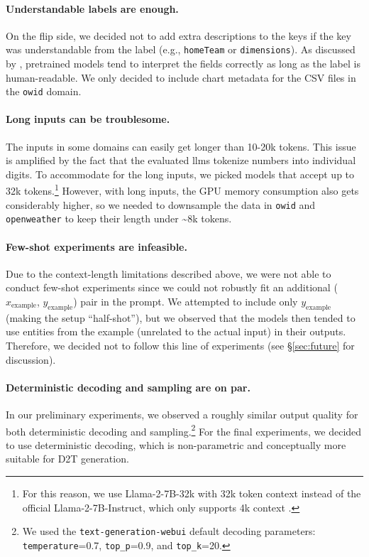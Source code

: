 \paragraph{Understandable labels are enough.} On the flip side, we decided not to add extra descriptions to the keys if the key was understandable from the label (e.g., \texttt{homeTeam} or \texttt{dimensions}). As discussed by \citet{kasner2023mind}, pretrained models tend to interpret the fields correctly as long as the label is human-readable. We only decided to include chart metadata for the CSV files in the \texttt{owid} domain.

\paragraph{Long inputs can be troublesome.} The inputs in some domains can easily get longer than 10-20k tokens. This issue is amplified by the fact that the evaluated \acp{llm} tokenize numbers into individual digits. To accommodate for the long inputs, we picked models that accept up to 32k tokens.\footnote{For this reason, we use Llama-2-7B-32k with 32k token context \cite{llama-2-7b-32k} instead of the official Llama-2-7B-Instruct, which only supports 4k context \cite{touvronLlamaOpenFoundation2023}.} However, with long inputs, the GPU memory consumption also gets considerably higher, so we needed to downsample the data in \texttt{owid} and \texttt{openweather} to keep their length under \textasciitilde 8k tokens.


\paragraph{Few-shot experiments are infeasible.} Due to the context-length limitations described above, we were not able to conduct few-shot experiments since we could not robustly fit an additional ($x_\text{example}$, $y_\text{example}$) pair in the prompt. We attempted to include only $y_\text{example}$ (making the setup ``half-shot''), but we observed that the models then tended to use entities from the example (unrelated to the actual input) in their outputs. Therefore, we decided not to follow this line of experiments (see §\ref{sec:future} for discussion).

\paragraph{Deterministic decoding and sampling are on par.} In our preliminary experiments, we observed a roughly similar output quality for both deterministic decoding and sampling.\footnote{We used the \texttt{text-generation-webui} default decoding parameters: \texttt{temperature}=0.7, \texttt{top\_p}=0.9, and \texttt{top\_k}=20.} For the final experiments, we decided to use deterministic decoding, which is non-parametric and conceptually more suitable for D2T generation.

